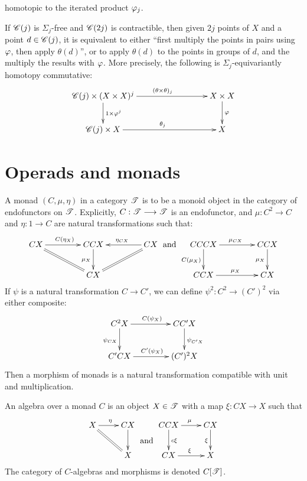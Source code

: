 \documentclass[11pt]{article}
\begin{document}
\begin{chapter1-3}
\begin{lem*}[1.9]
\begin{itemise}
homotopic to the iterated product $\oldphi_j$.
\item If $\mathscr{C}(j)$ is $\Sigma_j$-free and $\mathscr{C}(2j)$ is contractible, then given
$2j$ points of $X$ and a point $d\in\mathscr{C}(j)$, it is equivalent to either ``first
multiply the points in pairs using $\oldphi$, then apply $\theta(d)$'', or to apply 
$\theta(d)$ to the points in groups of $d$, and the multiply the results with
$\oldphi$. More precisely, the following is $\Sigma_j$-equivariantly homotopy
commutative:
\[\xymatrix@C=3cm{\scrC(j)\times(X\times X)^j
\ar[r]^{(\theta\times\theta)_j}\ar[d]^{1\times\oldphi^j}&X\times X\ar[d]^\oldphi\\
\scrC(j)\times X\ar[r]^{\theta_j}&X
}\]
\end{itemise}
\end{lem*}
\section{Operads and monads}
A monad $(C,\mu,\eta)$ in a category $\mathscr{T}$ is to be a monoid object in the category of endofunctors on $\mathscr{T}$. Explicitly, $C:\mathscr{T}\longrightarrow\mathscr{T}$ is an endofunctor, and $\mu:C^2\to C$ and $\eta:1\to C$ are natural transformations such that:
\[\xymatrix@C=1.5cm{
CX\ar[r]^{C(\eta_X)}&CCX\ar[d]_{\mu_X}&CX\ar[l]_{\eta_{CX}}\\
&CX\ar@{=}[lu]\ar@{=}[ru]
}
\text{ and }
\xymatrix@C=1.5cm{
CCCX\ar[r]^{\mu_{CX}}\ar[d]_{C(\mu_X)}&CCX\ar[d]_{\mu_X}\\
CCX\ar[r]^{\mu_X}&CX
}
\]
If $\psi$ is a natural transformation $C\to C'$, we can define
$\psi^2:C^2\to (C')^2$ via either composite:
\[\xymatrix@C=1.5cm{
C^2X\ar[d]_{\psi_{CX}}\ar[r]^{C(\psi_X)}&CC'X\ar[d]^{\psi_{C'X}}\\
C'CX\ar[r]^{C'(\psi_X)}&(C')^2X
}\]
Then a morphism of monads is a natural transformation compatible with unit and
multiplication.

An algebra over a monad $C$ is an object $X\in\mathscr{T}$ with a map $\xi:CX\to X$
such that
\[\xymatrix{
X\ar[r]^\eta&CX\ar[d]\\
&X\ar@{=}[lu]
}\raisebox{-.67cm}{\text{ and }}
\xymatrix{
CCX\ar[r]^\mu\ar[d]^{c\xi}&CX\ar[d]_\xi\\
CX\ar[r]^\xi&X
}\]
The category of $C$-algebras and morphisms is denoted $C[\mathscr{T}]$.


\end{chapter1-3}
\end{document}
